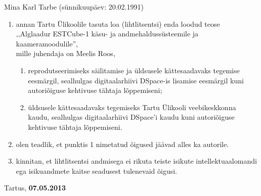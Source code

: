 \documentclass[12pt,a4paper]{article}
\begin{document}
Mina Karl Tarbe (sünnikuupäev: 20.02.1991)
\begin{enumerate}
	\item
		annan Tartu Ülikoolile tasuta loa (lihtlitsentsi) enda loodud teose\\
		,,Alglaadur ESTCube-1 käsu- ja andmehaldussüsteemile ja
		kaameramoodulile'',\\
		mille juhendaja on Meelis Roos,
		\begin{enumerate}
			\item 
				reprodutseerimiseks säilitamise ja üldsusele kättesaadavaks
				tegemise eesmärgil, sealhulgas digitaalarhiivi DSpace-is
				lisamise eesmärgil kuni autoriõiguse kehtivuse tähtaja
				lõppemiseni;
			\item
				üldsusele kättesaadavaks tegemiseks Tartu Ülikooli
				veebikeskkonna kaudu, sealhulgas digitaalarhiivi DSpace'i kaudu
				kuni autoriõiguse kehtivuse tähtaja lõppemiseni.
		\end{enumerate}
	\item
		olen teadlik, et punktis 1 nimetatud õigused jäävad alles ka autorile.
	\item
		kinnitan, et lihtlitsentsi andmisega ei rikuta teiste isikute
		intellektuaalomandi ega isikuandmete kaitse seadusest tulenevaid õigusi.
\end{enumerate}

Tartus, \textbf{07.05.2013}
\end{document}
